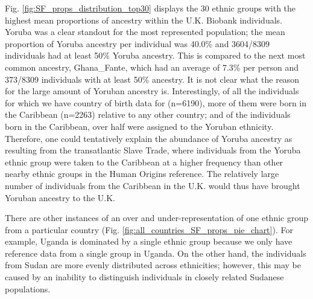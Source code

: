 Fig. \ref{fig:SF_props_distribution_top30} displays the 30 ethnic groups with the highest mean proportions of ancestry within the U.K. Biobank individuals. Yoruba was a clear standout for the most represented population; the mean proportion of Yoruba ancestry per individual was 40.0\% and 3604/8309 individuals had at least 50\% Yoruba ancestry. This is compared to the next most common ancestry, Ghana\_Fante, which had an average of 7.3\% per person and 373/8309 individuals with at least 50\% ancestry. It is not clear what the reason for the large amount of Yoruban ancestry is. Interestingly, of all the individuals for which we have country of birth data for (n=6190), more of them were born in the Caribbean (n=2263) relative to any other country; and of the individuals born in the Caribbean, over half were assigned to the Yoruban ethnicity. Therefore, one could tentatively explain the abundance of Yoruba ancestry as resulting from the transatlantic Slave Trade, where individuals from the Yoruba ethnic group were taken to the Caribbean at a higher frequency than other nearby ethnic groups in the Human Origins reference. The relatively large number of individuals from the Caribbean in the U.K. would thus have brought Yoruban ancestry to the U.K. 

There are other instances of an over and under-representation of one ethnic group from a particular country (Fig. \ref{fig:all_countries_SF_props_pie_chart}). For example, Uganda is dominated by a single ethnic group because we only have reference data from a single group in Uganda. On the other hand, the individuals from Sudan are more evenly distributed across ethnicities; however, this may be caused by an inability to distinguish individuals in closely related Sudanese populations. 

